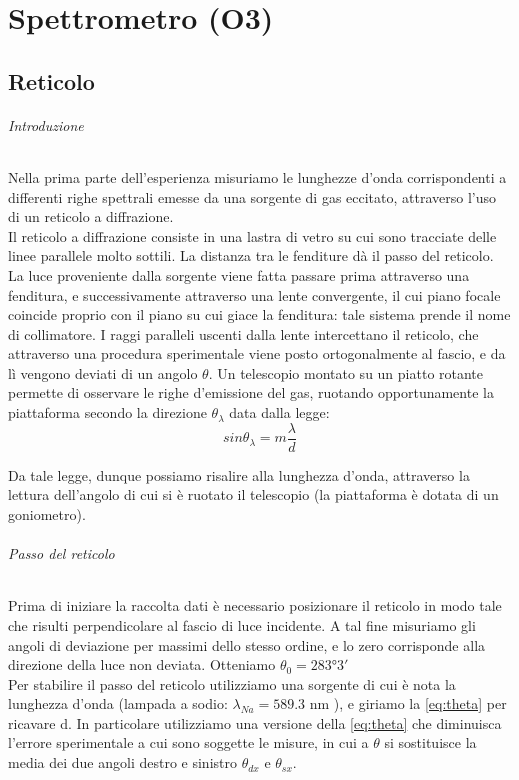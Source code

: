 \chapter{ Spettrometro (O3)}


\section*{Reticolo}

\subparagraph{Introduzione}

Nella prima parte dell'esperienza misuriamo le lunghezze d'onda corrispondenti a differenti righe spettrali emesse da una sorgente di gas eccitato, attraverso l'uso di un reticolo a diffrazione. \\
Il reticolo a diffrazione consiste in una lastra di vetro su cui sono tracciate delle linee parallele molto sottili. La distanza tra le fenditure dà il passo del reticolo.\\
La luce proveniente dalla sorgente viene fatta passare prima attraverso una fenditura, e successivamente attraverso una lente convergente, il cui piano focale coincide proprio con il piano su cui giace la fenditura: tale sistema prende il nome di collimatore. I raggi paralleli uscenti dalla lente intercettano il reticolo, che attraverso una procedura sperimentale viene posto ortogonalmente al fascio, e da lì vengono deviati di un angolo $\theta$. Un telescopio montato su un piatto rotante permette di osservare le righe d'emissione del gas, ruotando opportunamente la piattaforma secondo la direzione $\theta_{\lambda} $ data dalla legge:
\begin{equation}
sin \theta_{\lambda} = m \frac{\lambda}{d}
\label{eq:theta}
\end{equation}


Da tale legge, dunque possiamo risalire alla lunghezza d'onda, attraverso la lettura dell'angolo di cui si è ruotato il telescopio (la piattaforma è dotata di un goniometro).

\subparagraph{Passo del reticolo}

Prima di iniziare la raccolta dati è necessario posizionare il reticolo in modo tale che risulti perpendicolare al fascio di luce incidente. A tal fine misuriamo gli angoli di deviazione per massimi dello stesso ordine, e lo zero corrisponde alla direzione della luce non deviata. Otteniamo $\theta_{0} = 283° 3' $ \\
Per stabilire il passo del reticolo utilizziamo una sorgente di cui è nota la lunghezza d'onda (lampada a sodio: $\lambda_{Na} = 589.3 $ nm ), e giriamo la \ref{eq:theta} per ricavare d. In particolare utilizziamo una versione della \ref{eq:theta} che diminuisca l'errore sperimentale a cui sono soggette le misure, in cui a $\theta$ si sostituisce la media dei due angoli destro e sinistro $\theta_{dx} $ e $\theta_{sx}$.

